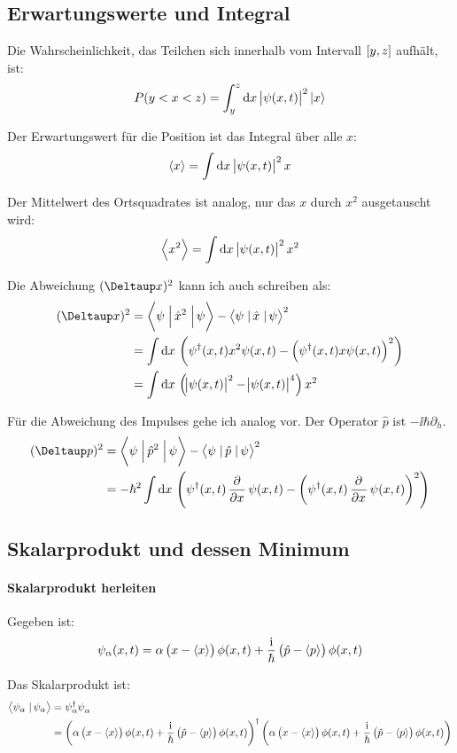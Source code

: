 \subsection{Erwartungswerte und Integral}

Die Wahrscheinlichkeit, das Teilchen sich innerhalb vom Intervall $\intcc{y,
z}$ aufhält, ist:
\[
	P(y < x < z) = \int_y^z \dif x \, \abs{\psi(x, t)}^2 \ket x
\]

Der Erwartungswert für die Position ist das Integral über alle $x$:
\[
	\bracket x = \int\dif x \, \abs{\psi(x, t)}^2 x
\]

Der Mittelwert des Ortsquadrates ist analog, nur das $x$ durch $x^2$
ausgetauscht wird:
\[
	\bracket{x^2} = \int\dif x \, \abs{\psi(x, t)}^2 x^2
\]

Die Abweichung $(\Deltaup x)^2$ kann ich auch schreiben als:
\cite{wikipedia-quantum_operators}
\begin{align*}
	(\Deltaup x)^2
	&= \braproket{\psi}{\hat x^2}{\psi} - \braproket{\psi}{\hat x}{\psi}^2 \\
	&= \int \dif x \, \del{\psi^\dagger(x, t) x^2 \psi(x, t) - \del{\psi^\dagger(x, t) x \psi(x, t)}^2} \\
	&= \int \dif x \, \del{\abs{\psi(x, t)}^2 - \abs{\psi(x, t)}^4} x^2
\end{align*}

Für die Abweichung des Impulses gehe ich analog vor. Der Operator $\hat p$ ist
$- \ii \hbar \partial_h$.
\begin{align*}
	(\Deltaup p)^2
	&= \braproket{\psi}{\hat p^2}{\psi} - \braproket{\psi}{\hat p}{\psi}^2 \\
	&= - \hbar^2 \int \dif x \, \del{\psi^\dagger(x, t) \dpd{}x \psi(x, t) - \del{\psi^\dagger(x, t) \dpd{}x \psi(x, t)}^2}
\end{align*}

\fehlt

\subsection{Skalarprodukt und dessen Minimum}

\paragraph{Skalarprodukt herleiten}

Gegeben ist:
\[
	\psi_\alpha(x, t) = \alpha \del{x - \bracket x} \phi(x, t) + \frac\ii\hbar \del{\hat p - \bracket p} \phi(x, t)
\]

Das Skalarprodukt ist:
\begin{align*}
	\braket{\psi_\alpha}{\psi_\alpha}
	&= \psi_\alpha^\dagger \psi_\alpha^{} \\
	&= \del{\alpha \del{x - \bracket x} \phi(x, t) + \frac\ii\hbar \del{\hat p - \bracket p} \phi(x, t)}^\dagger \del{\alpha \del{x - \bracket x} \phi(x, t) + \frac\ii\hbar \del{\hat p - \bracket p} \phi(x, t)}
\end{align*}


